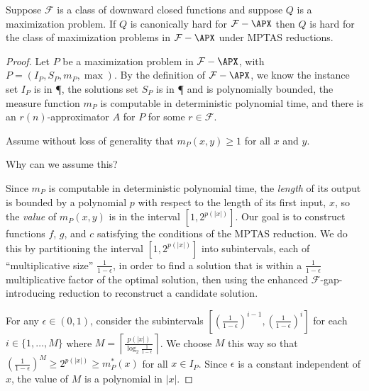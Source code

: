 \documentclass{article}
\newcommand{\ceil}[1]{\left\lceil#1\right\rceil}
\begin{document}
\begin{theorem}
  Suppose $\mathcal{F}$ is a class of downward closed functions and suppose $Q$ is a maximization problem.
  If $Q$ is canonically hard for $\mathcal{F}-\APX$ then $Q$ is hard for the class of maximization problems in $\mathcal{F}-\APX$ under MPTAS reductions.
\end{theorem}
\begin{proof}
  Let $P$ be a maximization problem in $\mathcal{F}-\APX$, with $P = (I_P, S_P, m_P, \max)$.
  By the definition of $\mathcal{F}-\APX$, we know the instance set $I_P$ is in \P, the solutions set $S_P$ is in \P{} and is polynomially bounded, the measure function $m_P$ is computable in deterministic polynomial time, and there is an $r(n)$-approximator $A$ for $P$ for some $r \in \mathcal{F}$.

  Assume without loss of generality that $m_P(x, y) \geq 1$ for all $x$ and $y$.
  \begin{todo}
    Why can we assume this?
  \end{todo}
  Since $m_P$ is computable in deterministic polynomial time, the \emph{length} of its output is bounded by a polynomial $p$ with respect to the length of its first input, $x$, so the \emph{value} of $m_P(x, y)$ is in the interval $[1, 2^{p(|x|)}]$.
  Our goal is to construct functions $f$, $g$, and $c$ satisfying the conditions of the MPTAS reduction.
  We do this by partitioning the interval $[1, 2^{p(|x|)}]$ into subintervals, each of ``multiplicative size'' $\frac{1}{1 - \epsilon}$, in order to find a solution that is within a $\frac{1}{1 - \epsilon}$ multiplicative factor of the optimal solution, then using the enhanced $\mathcal{F}$-gap-introducing reduction to reconstruct a candidate solution.

  For any $\epsilon \in (0, 1)$, consider the subintervals $\left[\left(\frac{1}{1 - \epsilon}\right)^{i - 1}, \left(\frac{1}{1 - \epsilon}\right)^i\right]$ for each $i \in \{1, \dotsc, M\}$ where $M = \ceil{\frac{p(|x|)}{\log_2{\frac{1}{1 - \epsilon}}}}$.
  We choose $M$ this way so that $\left(\frac{1}{1 - \epsilon}\right)^M \geq 2^{p(|x|)} \geq m_P^*(x)$ for all $x \in I_P$.
  Since $\epsilon$ is a constant independent of $x$, the value of $M$ is a polynomial in $|x|$.


\end{proof}
\end{document}
